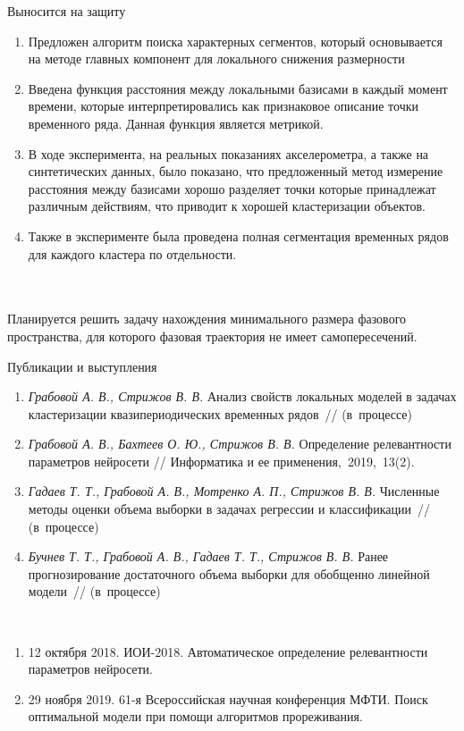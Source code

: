 \documentclass[9pt,pdf,hyperref={unicode}]{beamer}
\begin{document}
\begin{frame}{Выносится на защиту}
\justifying

	\begin{enumerate}
	\justifying
		\item Предложен алгоритм поиска характерных сегментов, который основывается на методе главных компонент для локального снижения размерности
		\item Введена функция расстояния между локальными базисами в каждый момент времени, которые интерпретировались как признаковое описание точки временного ряда. Данная функция является метрикой.
		\item В ходе эксперимента, на реальных показаниях акселерометра, а также на синтетических данных, было показано, что предложенный метод измерение расстояния между базисами хорошо разделяет точки которые принадлежат различным действиям, что приводит к хорошей кластеризации объектов.
		\item Также в эксперименте была проведена полная сегментация временных рядов для каждого кластера по отдельности.
	\end{enumerate}
	
~\\
~\\
	Планируется решить задачу нахождения минимального размера фазового пространства, для которого  фазовая траектория не имеет самопересечений.
\end{frame}
\begin{frame}{Публикации и выступления}
\justifying
	\begin{enumerate}
	\justifying
		\item \textit{Грабовой А. В., Стрижов В. В.} Анализ свойств локальных моделей в задачах кластеризации квазипериодических временных рядов~// (в~процессе)
		\item \textit{Грабовой А. В., Бахтеев О. Ю., Стрижов В. В.} Определение релевантности параметров нейросети // Информатика и ее применения,~2019,~13(2).
		\item \textit{Гадаев Т. Т., Грабовой А. В., Мотренко А. П., Стрижов В. В.} Численные методы оценки объема выборки в задачах регрессии и классификации~// (в~процессе)
		\item \textit{Бучнев Т. Т., Грабовой А. В., Гадаев Т. Т., Стрижов В. В.} Ранее прогнозирование достаточного объема выборки для обобщенно линейной модели~// (в~процессе)
	\end{enumerate}
	
~\\
	\begin{enumerate}
	\justifying
		\item 12 октября 2018. ИОИ-2018. Автоматическое определение релевантности параметров нейросети.
		\item 29 ноября 2019. 61-я Всероссийская научная конференция МФТИ. Поиск оптимальной модели при помощи алгоритмов прореживания.
	\end{enumerate}
	
	
\end{frame}
\end{document}
